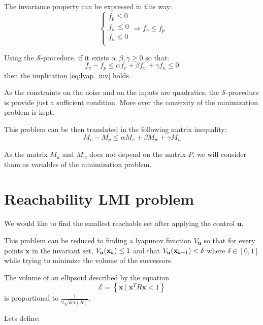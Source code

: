 \documentclass{article}
\theoremstyle{named}
\newcommand{\vect}[1]{\ensuremath{ \mathbf{#1}}}
\newcommand{\Sproc}{$\mathcal{S}$-procedure}
\begin{document}
The invariance property can be expressed in this way:
\begin{equation}\label{eq:lyap_inv}
\left\{
\begin{array}{l}
f_p \leq 0\\
f_w \leq 0\\
f_u \leq 0\\
\end{array}
\right.
\Rightarrow
f_v \leq f_p
\end{equation}

Using the \Sproc{}, if it exists $\alpha,\beta,\gamma \geq 0$ so that:
$$
f_v-f_p \leq \alpha f_v + \beta f_w + \gamma f_u \leq 0
$$
then the implication \ref{eq:lyap_inv} holds.

As the constraints on the noise and on the inputs are quadratics, the \Sproc{} is provide just a sufficient condition. More over the convexity of the minimization problem is kept.

This problem can be then translated in the following matrix inequality:
$$
M_v-M_p \leq \alpha M_v + \beta M_w + \gamma M_u
$$

As the matrix $M_u$ and $M_w$ does not depend on the matrix $P$, we will consider tham as variables of the minimization problem.

\section{Reachability LMI problem}
\newcommand{\Vu}{V_{\vect{u}}}
We would like to find the smallest reachable set after applying the control $\vect{u}$.

This problem can be reduced to finding a lyapunov function $\Vu$ so that for every points $\vect{x}$ in the invariant set, $\Vu(\xk) \leq 1$ and that $\Vu(\xkn)< \delta$ where $\delta \in [0,1]$ while trying to minimize the volume of the successors.

The volume of an ellipsoid described by the equation 
$$
\mathcal{E} = \left\{ \vect{x} \mid \vect{x}^T R \vect{x} < 1 \right\}
$$
is proportional to $\frac{1}{2 \sqrt{det( R )}}$.

Lets define:
\end{document}
